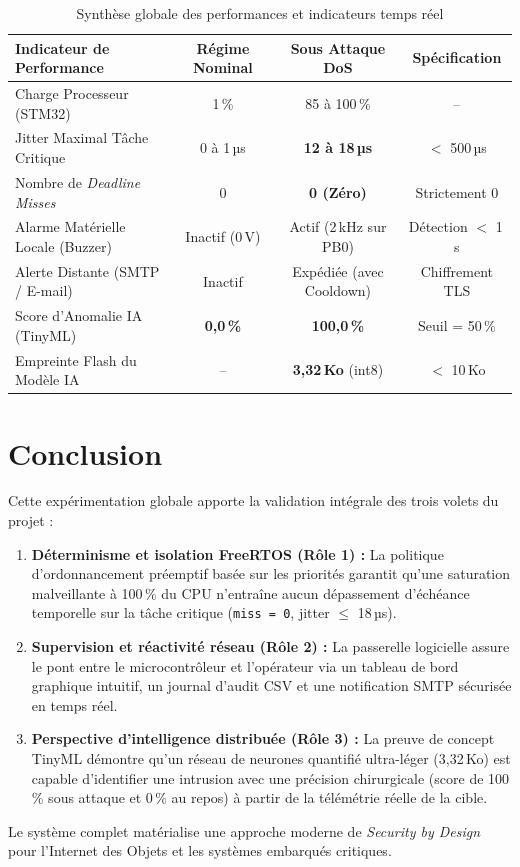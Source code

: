 \documentclass[a4paper,11pt]{article}
\begin{document}
\begin{table}[h!]
  \centering
  \caption{Synthèse globale des performances et indicateurs temps réel}
  \label{tab:synthese}
  \begin{tabular}{lccc}
    \toprule
    \textbf{Indicateur de Performance} & \textbf{Régime Nominal} & \textbf{Sous Attaque DoS} & \textbf{Spécification} \\
    \midrule
    Charge Processeur (STM32)          & 1\,\%                   & 85 à 100\,\%              & -- \\
    Jitter Maximal Tâche Critique      & 0 à 1\,µs               & \textbf{12 à 18\,µs}      & $<$ 500\,µs \\
    Nombre de \textit{Deadline Misses} & 0                       & \textbf{0 (Zéro)}         & Strictement 0 \\
    Alarme Matérielle Locale (Buzzer)  & Inactif (0\,V)          & Actif (2\,kHz sur PB0)    & Détection $<$ 1\,s \\
    Alerte Distante (SMTP / E-mail)    & Inactif                 & Expédiée (avec Cooldown)  & Chiffrement TLS \\
    Score d'Anomalie IA (TinyML)       & \textbf{0,0\,\%}        & \textbf{100,0\,\%}        & Seuil = 50\,\% \\
    Empreinte Flash du Modèle IA       & --                      & \textbf{3,32\,Ko} (int8)  & $<$ 10\,Ko \\
    \bottomrule
  \end{tabular}
\end{table}

\section{Conclusion}

Cette expérimentation globale apporte la validation intégrale des trois volets du projet :
\begin{enumerate}[leftmargin=1.8em]
  \item \textbf{Déterminisme et isolation FreeRTOS (Rôle 1) :} La politique d'ordonnancement préemptif basée sur les priorités garantit qu'une saturation malveillante à 100\,\% du CPU n'entraîne aucun dépassement d'échéance temporelle sur la tâche critique (\texttt{miss = 0}, jitter $\le$ 18\,µs).
  \item \textbf{Supervision et réactivité réseau (Rôle 2) :} La passerelle logicielle assure le pont entre le microcontrôleur et l'opérateur via un tableau de bord graphique intuitif, un journal d'audit CSV et une notification SMTP sécurisée en temps réel.
  \item \textbf{Perspective d'intelligence distribuée (Rôle 3) :} La preuve de concept TinyML démontre qu'un réseau de neurones quantifié ultra-léger (3,32\,Ko) est capable d'identifier une intrusion avec une précision chirurgicale (score de 100\,\% sous attaque et 0\,\% au repos) à partir de la télémétrie réelle de la cible.
\end{enumerate}

Le système complet matérialise une approche moderne de \textit{Security by Design} pour l'Internet des Objets et les systèmes embarqués critiques.
\end{document}
